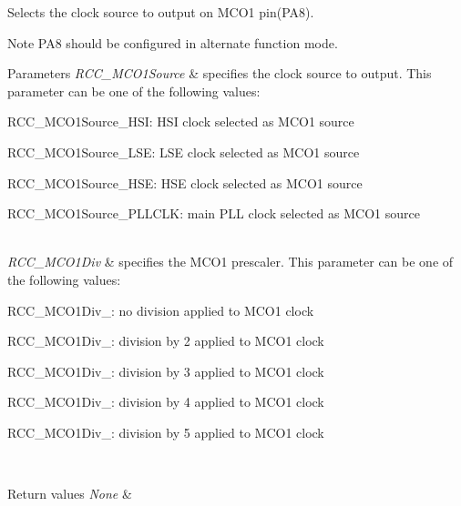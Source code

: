 Selects the clock source to output on M\+C\+O1 pin(\+P\+A8). 

\begin{DoxyNote}{Note}
P\+A8 should be configured in alternate function mode. 
\end{DoxyNote}

\begin{DoxyParams}{Parameters}
{\em R\+C\+C\+\_\+\+M\+C\+O1\+Source} & specifies the clock source to output. This parameter can be one of the following values\+: \begin{DoxyItemize}
\item R\+C\+C\+\_\+\+M\+C\+O1\+Source\+\_\+\+H\+SI\+: H\+SI clock selected as M\+C\+O1 source \item R\+C\+C\+\_\+\+M\+C\+O1\+Source\+\_\+\+L\+SE\+: L\+SE clock selected as M\+C\+O1 source \item R\+C\+C\+\_\+\+M\+C\+O1\+Source\+\_\+\+H\+SE\+: H\+SE clock selected as M\+C\+O1 source \item R\+C\+C\+\_\+\+M\+C\+O1\+Source\+\_\+\+P\+L\+L\+C\+LK\+: main P\+LL clock selected as M\+C\+O1 source \end{DoxyItemize}
\\
\hline
{\em R\+C\+C\+\_\+\+M\+C\+O1\+Div} & specifies the M\+C\+O1 prescaler. This parameter can be one of the following values\+: \begin{DoxyItemize}
\item R\+C\+C\+\_\+\+M\+C\+O1\+Div\+\_\+: no division applied to M\+C\+O1 clock \item R\+C\+C\+\_\+\+M\+C\+O1\+Div\+\_\+: division by 2 applied to M\+C\+O1 clock \item R\+C\+C\+\_\+\+M\+C\+O1\+Div\+\_\+: division by 3 applied to M\+C\+O1 clock \item R\+C\+C\+\_\+\+M\+C\+O1\+Div\+\_\+: division by 4 applied to M\+C\+O1 clock \item R\+C\+C\+\_\+\+M\+C\+O1\+Div\+\_\+: division by 5 applied to M\+C\+O1 clock \end{DoxyItemize}
\\
\hline
\end{DoxyParams}

\begin{DoxyRetVals}{Return values}
{\em None} & \\
\hline
\end{DoxyRetVals}
\mbox{\label{group___r_c_c_gaf50f10675b747de60c739e44e5c22aee}} 
